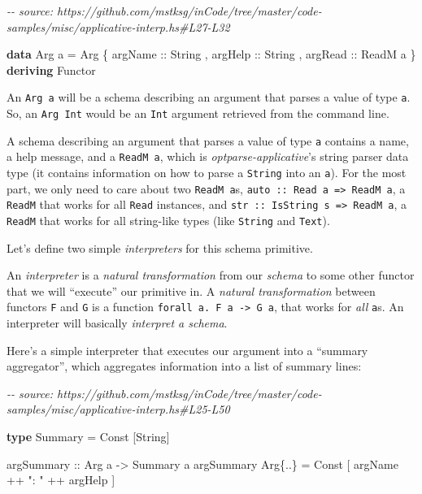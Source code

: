 \documentclass[]{article}
\newenvironment{Shaded}{}{}
\newcommand{\CommentTok}[1]{\textcolor[rgb]{0.38,0.63,0.69}{\textit{#1}}}
\newcommand{\DataTypeTok}[1]{\textcolor[rgb]{0.56,0.13,0.00}{#1}}
\newcommand{\KeywordTok}[1]{\textcolor[rgb]{0.00,0.44,0.13}{\textbf{#1}}}
\newcommand{\NormalTok}[1]{#1}
\newcommand{\OperatorTok}[1]{\textcolor[rgb]{0.40,0.40,0.40}{#1}}
\newcommand{\OtherTok}[1]{\textcolor[rgb]{0.00,0.44,0.13}{#1}}
\newcommand{\StringTok}[1]{\textcolor[rgb]{0.25,0.44,0.63}{#1}}
\begin{document}
\begin{Shaded}
\begin{Highlighting}[]
\CommentTok{{-}{-} source: https://github.com/mstksg/inCode/tree/master/code{-}samples/misc/applicative{-}interp.hs\#L27{-}L32}

\KeywordTok{data} \DataTypeTok{Arg}\NormalTok{ a }\OtherTok{=} \DataTypeTok{Arg}
\NormalTok{    \{}\OtherTok{ argName  ::} \DataTypeTok{String}
\NormalTok{    ,}\OtherTok{ argHelp  ::} \DataTypeTok{String}
\NormalTok{    ,}\OtherTok{ argRead  ::} \DataTypeTok{ReadM}\NormalTok{ a}
\NormalTok{    \}}
  \KeywordTok{deriving} \DataTypeTok{Functor}
\end{Highlighting}
\end{Shaded}

An \texttt{Arg\ a} will be a schema describing an argument that parses a value
of type \texttt{a}. So, an \texttt{Arg\ Int} would be an \texttt{Int} argument
retrieved from the command line.

A schema describing an argument that parses a value of type \texttt{a} contains
a name, a help message, and a \texttt{ReadM\ a}, which is
\emph{optparse-applicative}'s string parser data type (it contains information
on how to parse a \texttt{String} into an \texttt{a}). For the most part, we
only need to care about two \texttt{ReadM\ a}s,
\texttt{auto\ ::\ Read\ a\ =\textgreater{}\ ReadM\ a}, a \texttt{ReadM} that
works for all \texttt{Read} instances, and
\texttt{str\ ::\ IsString\ s\ =\textgreater{}\ ReadM\ a}, a \texttt{ReadM} that
works for all string-like types (like \texttt{String} and \texttt{Text}).

Let's define two simple \emph{interpreters} for this schema primitive.

An \emph{interpreter} is a \emph{natural transformation} from our \emph{schema}
to some other functor that we will ``execute'' our primitive in. A \emph{natural
transformation} between functors \texttt{F} and \texttt{G} is a function
\texttt{forall\ a.\ F\ a\ -\textgreater{}\ G\ a}, that works for \emph{all}
\texttt{a}s. An interpreter will basically \emph{interpret a schema}.

Here's a simple interpreter that executes our argument into a ``summary
aggregator'', which aggregates information into a list of summary lines:

\begin{Shaded}
\begin{Highlighting}[]
\CommentTok{{-}{-} source: https://github.com/mstksg/inCode/tree/master/code{-}samples/misc/applicative{-}interp.hs\#L25{-}L50}

\KeywordTok{type} \DataTypeTok{Summary} \OtherTok{=} \DataTypeTok{Const}\NormalTok{ [}\DataTypeTok{String}\NormalTok{]}

\OtherTok{argSummary ::} \DataTypeTok{Arg}\NormalTok{ a }\OtherTok{{-}\textgreater{}} \DataTypeTok{Summary}\NormalTok{ a}
\NormalTok{argSummary }\DataTypeTok{Arg}\NormalTok{\{}\OperatorTok{..}\NormalTok{\} }\OtherTok{=} \DataTypeTok{Const}\NormalTok{ [ argName }\OperatorTok{++} \StringTok{": "} \OperatorTok{++}\NormalTok{ argHelp ]}
\end{Highlighting}
\end{Shaded}
\end{document}
